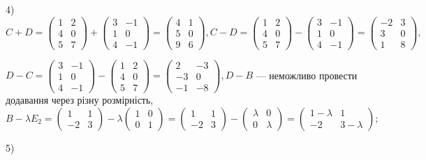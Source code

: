\documentclass[12pt,a4paper]{article}
\begin{document}
    4) \(C + D = 
    \begin{pmatrix}
    1 & 2\\
    4 & 0 \\
    5 & 7 
    \end{pmatrix} + 
    \begin{pmatrix}
    3 & -1 \\
    1 & 0 \\
    4 & -1 
    \end{pmatrix} = 
    \begin{pmatrix}
    4 & 1 \\
    5 & 0 \\
    9 & 6 
    \end{pmatrix}
    ,
    C - D = 
    \begin{pmatrix}
    1 & 2\\
    4 & 0 \\
    5 & 7 
    \end{pmatrix} - 
    \begin{pmatrix}
    3 & -1 \\
    1 & 0 \\
    4 & -1 
    \end{pmatrix} = 
    \begin{pmatrix}
    -2 & 3 \\
    3 & 0 \\
    1 & 8 
    \end{pmatrix},
    \)

    \(
    D - C= 
    \begin{pmatrix}
    3 & -1 \\
    1 & 0 \\
    4 & -1 
    \end{pmatrix} - 
    \begin{pmatrix}
    1 & 2\\
    4 & 0 \\
    5 & 7 
    \end{pmatrix} = 
    \begin{pmatrix}
    2 & -3\\
    -3 & 0 \\
    -1 & -8 
    \end{pmatrix},
    D - B
    \) ---  неможливо провести додавання через різну розмірність,
    \(B - \lambda E_2 = 
    \begin{pmatrix}
    1 & 1\\
    -2 & 3 
    \end{pmatrix} - 
    \lambda\begin{pmatrix}
    1 & 0\\
    0 & 1 
    \end{pmatrix} = 
    \begin{pmatrix}
    1 & 1\\
    -2 & 3 
    \end{pmatrix} - 
    \begin{pmatrix}
    \lambda & 0\\
    0 & \lambda 
    \end{pmatrix} = 
    \begin{pmatrix}
    1-\lambda & 1\\
    -2 & 3-\lambda 
    \end{pmatrix};
    \)

    5)
\end{document}
